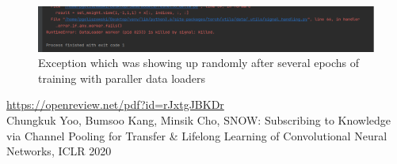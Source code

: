 \documentclass[12pt]{article}
\begin{document}
    \begin{figure}
        \centering
        \includegraphics[width=\linewidth]{exception}
        \caption{Exception which was showing up randomly after several epochs of training with paraller data loaders}
        \label{fig:exception}
    \end{figure}


    \begin{thebibliography}{99}
         \href{https://openreview.net/pdf?id=rJxtgJBKDr}{https://openreview.net/pdf?id=rJxtgJBKDr} \\
        Chungkuk Yoo, Bumsoo Kang, Minsik Cho, SNOW: Subscribing to Knowledge via Channel Pooling for Transfer \& Lifelong Learning of Convolutional Neural Networks, ICLR 2020
    \end{thebibliography}
\end{document}
